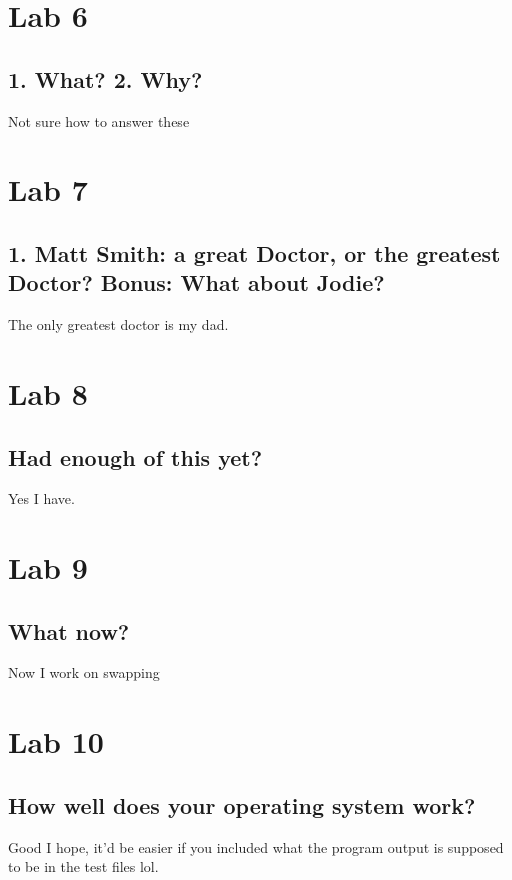 \documentclass[letterpaper, 10pt,DIV=13]{scrartcl}
\numberwithin{equation}{section} %
\numberwithin{figure}{section} %
\numberwithin{table}{section} %
\begin{document}
\pagebreak


\section{Lab 6}
\subsection{1. What? 2. Why?}
Not sure how to answer these 
\pagebreak

\section{Lab 7}
\subsection{1. Matt Smith: a great Doctor, or the greatest Doctor? Bonus: What about Jodie?}
The only greatest doctor is my dad.
\pagebreak
\section{Lab 8}
\subsection{Had enough of this yet?}
Yes I have.
\section{Lab 9}
\subsection{What now?}
Now I work on swapping 
\section{Lab 10}
\subsection{How well does your operating system work?}
Good I hope, it'd be easier if you included what the program output is supposed to be in the test files lol.
\end{document}
